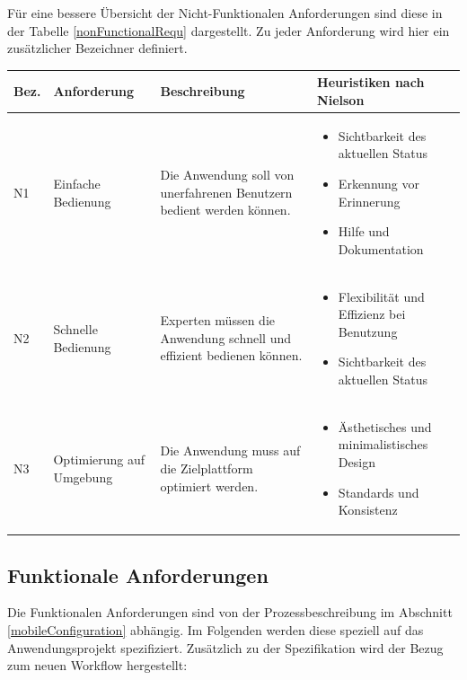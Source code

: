 Für eine bessere Übersicht der Nicht-Funktionalen Anforderungen sind diese in der Tabelle \ref{nonFunctionalRequ} dargestellt. Zu jeder Anforderung wird hier ein zusätzlicher Bezeichner definiert.


\begin{tabular}[H]{| p{0.7cm} | p{2.2cm} | p{4.5cm} | p{5.5cm}|}

\toprule[2pt] \rowcolor{dunkelgrau}
\hline
  Bez. & Anforderung & Beschreibung & Heuristiken nach Nielson \\
  \hline
  N1 & Einfache \newline Bedienung & Die Anwendung soll von unerfahrenen Benutzern bedient werden können.& \begin{itemize}
          \item Sichtbarkeit des aktuellen Status
          \item Erkennung vor Erinnerung
          \item Hilfe und Dokumentation
  \end{itemize} \\
  \hline
  N2 & Schnelle \newline Bedienung & Experten müssen die Anwendung schnell und effizient bedienen können. & \begin{itemize}
            \item Flexibilität und Effizienz bei Benutzung
            \item Sichtbarkeit des aktuellen Status
    \end{itemize}  \\
  \hline
    N3 & Optimierung auf Umgebung & Die Anwendung muss auf die Zielplattform optimiert werden. &  \begin{itemize}
              \item Ästhetisches und minimalistisches Design
              \item Standards und Konsistenz
      \end{itemize} \\
    \hline
\bottomrule[2pt]
\end{tabular}
\label{nonFunctionalRequ}

\subsection{Funktionale Anforderungen}
Die Funktionalen Anforderungen sind von der Prozessbeschreibung im Abschnitt \ref{mobileConfiguration} abhängig. Im Folgenden werden diese speziell auf das Anwendungsprojekt spezifiziert. Zusätzlich zu der Spezifikation wird der Bezug zum neuen Workflow hergestellt:

